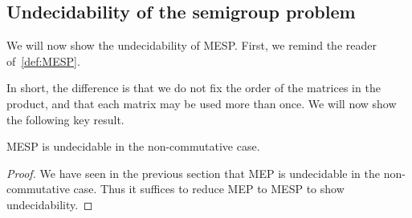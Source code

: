 \subsection{Undecidability of the semigroup problem}

We will now show the undecidability of MESP. First, we remind the reader of~\cref{def:MESP}.
\MESP*

In short, the difference is that we do not fix the order of the matrices in the product, and that each matrix may be used more than once. We will now show the following key result.

\begin{theorem}
  MESP is undecidable in the non-commutative case.
\end{theorem}

\begin{proof}
We have seen in the previous section that MEP is undecidable in the non-commutative
case. Thus it suffices to reduce MEP to MESP to show undecidability.


\end{proof}
